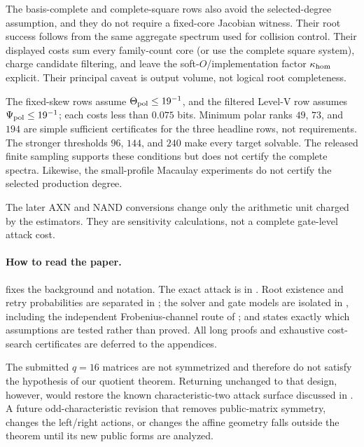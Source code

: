 \documentclass[11pt]{article}
\begin{document}
The basis-complete and complete-square rows also avoid the selected-degree
assumption, and they do not require a fixed-core Jacobian witness.  Their root
success follows from the same aggregate spectrum used for collision control.
Their displayed costs sum every family-count core (or use the complete square
system), charge candidate filtering, and leave the soft-$O$/implementation
factor $\kappa_{\rm hom}$ explicit.  Their principal caveat is output volume,
not logical root completeness.

The fixed-skew rows assume $\Theta_{\rm pol}\le19^{-1}$, and the filtered
Level-V row assumes $\Psi_{\rm pol}\le19^{-1}$; each costs less than $0.075$
bits.  Minimum polar ranks $49$, $73$, and $194$ are simple sufficient
certificates for the three headline rows, not requirements.
The stronger thresholds $96$, $144$, and $240$ make every target solvable.
The released finite sampling supports these conditions but does not certify
the complete spectra.  Likewise, the small-profile Macaulay experiments do
not certify the selected production degree.

The later AXN and NAND conversions change only the arithmetic unit charged by
the estimators.  They are sensitivity calculations, not a complete gate-level
attack cost.

\paragraph{How to read the paper.}
 fixes the background and notation.  The exact attack is
in .  Root existence and
retry probabilities are separated in ; the solver and gate
models are isolated in , including the independent
Frobenius-channel route of ; and
 states exactly which assumptions are tested rather than
proved.  All long proofs and exhaustive cost-search certificates are deferred
to the appendices.

The submitted $q=16$ matrices are not symmetrized and therefore do not satisfy
the hypothesis of our quotient theorem.  Returning unchanged to that design,
however, would restore the known characteristic-two attack surface discussed
in .  A future odd-characteristic revision that removes
public-matrix symmetry, changes the left/right actions, or changes the affine
geometry falls outside the theorem until its new public forms are analyzed.
\end{document}
